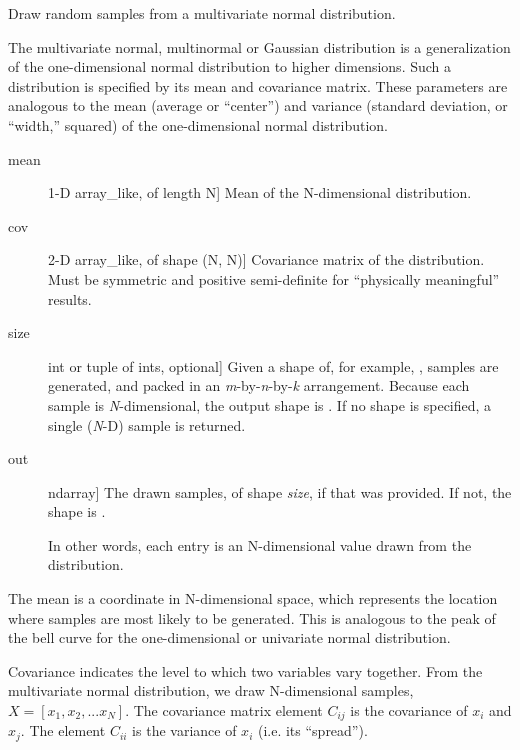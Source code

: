 \documentclass[letterpaper,10pt,english]{sphinxmanual}
\begin{document}
\begin{fulllineitems}
\label{pygeomod:pygeomod.geomodeller_xml_obj.multivariate_normal}
Draw random samples from a multivariate normal distribution.

The multivariate normal, multinormal or Gaussian distribution is a
generalization of the one-dimensional normal distribution to higher
dimensions.  Such a distribution is specified by its mean and
covariance matrix.  These parameters are analogous to the mean
(average or ``center'') and variance (standard deviation, or ``width,''
squared) of the one-dimensional normal distribution.
\begin{description}
\item[{mean}] \leavevmode{[}1-D array\_like, of length N{]}
Mean of the N-dimensional distribution.

\item[{cov}] \leavevmode{[}2-D array\_like, of shape (N, N){]}
Covariance matrix of the distribution.  Must be symmetric and
positive semi-definite for ``physically meaningful'' results.

\item[{size}] \leavevmode{[}int or tuple of ints, optional{]}
Given a shape of, for example, ,  samples are
generated, and packed in an \emph{m}-by-\emph{n}-by-\emph{k} arrangement.  Because
each sample is \emph{N}-dimensional, the output shape is .
If no shape is specified, a single (\emph{N}-D) sample is returned.

\end{description}
\begin{description}
\item[{out}] \leavevmode{[}ndarray{]}
The drawn samples, of shape \emph{size}, if that was provided.  If not,
the shape is .

In other words, each entry  is an N-dimensional
value drawn from the distribution.

\end{description}

The mean is a coordinate in N-dimensional space, which represents the
location where samples are most likely to be generated.  This is
analogous to the peak of the bell curve for the one-dimensional or
univariate normal distribution.

Covariance indicates the level to which two variables vary together.
From the multivariate normal distribution, we draw N-dimensional
samples, \(X = [x_1, x_2, ... x_N]\).  The covariance matrix
element \(C_{ij}\) is the covariance of \(x_i\) and \(x_j\).
The element \(C_{ii}\) is the variance of \(x_i\) (i.e. its
``spread'').


\end{fulllineitems}
\end{document}
